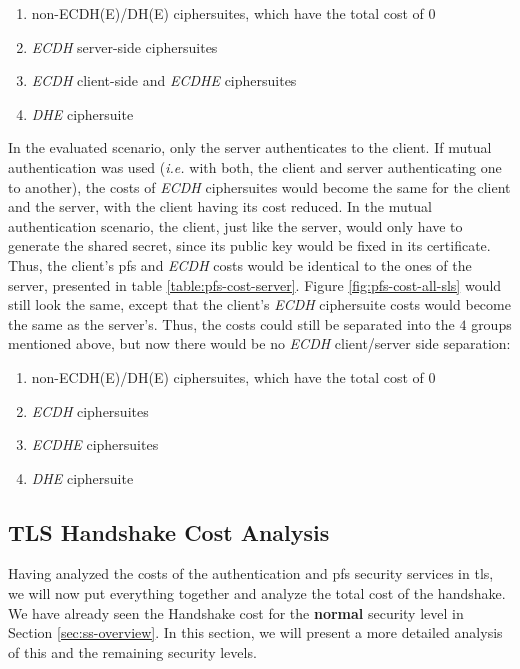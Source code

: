\begin{enumerate}
  \item non-ECDH(E)/DH(E) ciphersuites, which have the total cost of $0$
  \item \textit{ECDH} server-side ciphersuites
  \item \textit{ECDH} client-side and \textit{ECDHE} ciphersuites
  \item \textit{DHE} ciphersuite
\end{enumerate}

In the evaluated scenario, only the server authenticates to the client. If mutual authentication was used (\textit{i.e.} with both, the client
and server authenticating one to another), the costs of \textit{ECDH} ciphersuites would become the same for the client and the server, with the client
having its cost reduced. In the mutual authentication scenario, the client, just like the server, would only have to generate the shared secret, since
its public key would be fixed in its certificate. Thus, the client's \gls{pfs} and \textit{ECDH} costs would be identical to the ones of the server,
presented in table \ref{table:pfs-cost-server}. Figure \ref{fig:pfs-cost-all-sls} would still look the same, except that the client's \textit{ECDH}
ciphersuite costs would become the same as the server's. Thus, the costs could still be separated into the $4$ groups mentioned above,
but now there would be no \textit{ECDH} client/server side separation:

\begin{enumerate}
  \item non-ECDH(E)/DH(E) ciphersuites, which have the total cost of $0$
  \item \textit{ECDH} ciphersuites
  \item \textit{ECDHE} ciphersuites
  \item \textit{DHE} ciphersuite
\end{enumerate}

\subsection{TLS Handshake Cost Analysis} \label{sec:tls-hs-cost}

Having analyzed the costs of the authentication and \gls{pfs} security services in \gls{tls}, we will now put everything together and
analyze the total cost of the handshake. We have already seen the Handshake cost for the \textbf{normal} security level in
Section \ref{sec:ss-overview}. In this section, we will present a more detailed analysis of this and the remaining security levels.

